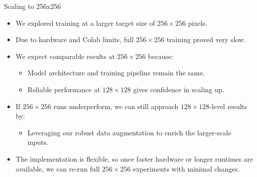 \begin{frame}{Scaling to 256x256}
    \begin{itemize}
        \item We explored training at a larger target size of $256\times256$ pixels.
        \item Due to hardware and Colab limits, full $256\times256$ training proved very slow.
        \item We expect comparable results at $256\times256$ because:
            \begin{itemize}
                \item Model architecture and training pipeline remain the same.
                \item Reliable performance at $128\times128$ gives confidence in scaling up.
            \end{itemize}
        \item If $256\times256$ runs underperform, we can still approach $128\times128$-level results by:
            \begin{itemize}
                \item Leveraging our robust data augmentation to enrich the larger-scale inputs.
            \end{itemize}
        \item The implementation is flexible, so once faster hardware or longer runtimes are available, we can re-run full $256\times256$ experiments with minimal changes.
    \end{itemize}
\end{frame}
